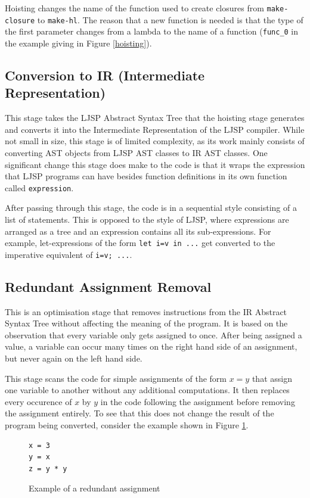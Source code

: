 \documentclass[11pt]{report}
\begin{document}
Hoisting changes the name of the function used to create closures from \texttt{make-closure} to \texttt{make-hl}. The reason that a new function is needed is that the type of the first parameter changes from a lambda to the name of a function (\texttt{func_0} in the example giving in Figure \ref{hoisting}).

\subsection{Conversion to IR (Intermediate Representation)}
This stage takes the LJSP Abstract Syntax Tree that the hoisting stage generates and converts it into the Intermediate Representation of the LJSP compiler. While not small in size, this stage is of limited complexity, as its work mainly consists of converting AST objects from LJSP AST classes to IR AST classes. One significant change this stage does make to the code is that it wraps the expression that LJSP programs can have besides function definitions in its own function called \texttt{expression}.

After passing through this stage, the code is in a sequential style consisting of a list of statements. This is opposed to the style of LJSP, where expressions are arranged as a tree and an expression contains all its sub-expressions. For example, let-expressions of the form \texttt{let i=v in ...} get converted to the imperative equivalent of \texttt{i=v; ...}.

\subsection{Redundant Assignment Removal}
This is an optimisation stage that removes instructions from the IR Abstract Syntax Tree without affecting the meaning of the program. It is based on the observation that every variable only gets assigned to once. After being assigned a value, a variable can occur many times on the right hand side of an assignment, but never again on the left hand side.

This stage scans the code for simple assignments of the form $x = y$ that assign one variable to another without any additional computations. It then replaces every occurence of $x$ by $y$ in the code following the assignment before removing the assignment entirely. To see that this does not change the result of the program being converted, consider the example shown in Figure \ref{redrem1}.
\begin{figure}[ht]
\begin{lstlisting}
x = 3
y = x
z = y * y
\end{lstlisting}
\caption{Example of a redundant assignment}
\label{redrem1}
\end{figure}
\end{document}
